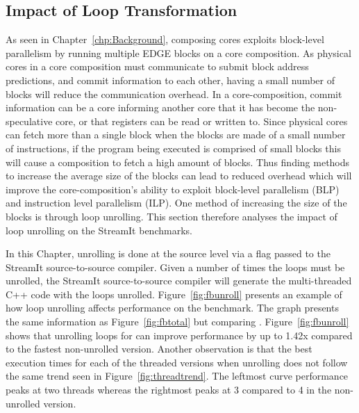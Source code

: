 \subsection{Impact of Loop Transformation}
As seen in Chapter~\ref{chp:Background}, composing cores exploits block-level parallelism by running multiple EDGE blocks on a core composition.
As physical cores in a core composition must communicate to submit block address predictions, and commit information to each other, having a small number of blocks will reduce the communication overhead.
In a core-composition, commit information can be a core informing another core that it has become the non-speculative core, or that registers can be read or written to.
Since physical cores can fetch more than a single block when the blocks are made of a small number of instructions, if the program being executed is comprised of small blocks this will cause a composition to fetch a high amount of blocks.
Thus finding methods to increase the average size of the blocks can lead to reduced overhead which will improve the core-composition's ability to exploit block-level parallelism (BLP) and instruction level parallelism (ILP).
One method of increasing the size of the blocks is through loop unrolling.
This section therefore analyses the impact of loop unrolling on the StreamIt benchmarks.

In this Chapter, unrolling is done at the source level via a flag passed to the StreamIt source-to-source compiler.
Given a number of times the loops must be unrolled, the StreamIt source-to-source compiler will generate the multi-threaded C++ code with the loops unrolled.
Figure~\ref{fig:fbunroll} presents an example of how loop unrolling affects performance on the  benchmark.
The graph presents the same information as Figure~\ref{fig:fbtotal} but comparing .
Figure~\ref{fig:fbunroll} shows that unrolling loops for  can improve performance by up to 1.42x compared to the fastest non-unrolled version.
Another observation is that the best execution times for each of the threaded versions when unrolling does not follow the same trend seen in Figure~\ref{fig:threadtrend}.
The leftmost curve performance peaks at two threads whereas the rightmost peaks at 3 compared to 4 in the non-unrolled version.


